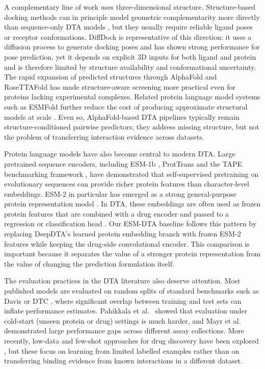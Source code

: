 A complementary line of work uses three-dimensional structure. Structure-based docking methods can in principle model geometric complementarity more directly than sequence-only DTA models \cite{kitchen2004docking}, but they usually require reliable ligand poses or receptor conformations. DiffDock \cite{corso2023diffdock} is representative of this direction: it uses a diffusion process to generate docking poses and has shown strong performance for pose prediction, yet it depends on explicit 3D inputs for both ligand and protein and is therefore limited by structure availability and conformational uncertainty. The rapid expansion of predicted structures through AlphaFold \cite{jumper2021alphafold} and RoseTTAFold \cite{baek2021rosettafold} has made structure-aware screening more practical even for proteins lacking experimental complexes. Related protein language model systems such as ESMFold further reduce the cost of producing approximate structural models at scale \cite{lin2023esm2}. Even so, AlphaFold-based DTA pipelines typically remain structure-conditioned pairwise predictors; they address missing structure, but not the problem of transferring interaction evidence across datasets.

Protein language models have also become central to modern DTA. Large pretrained sequence encoders, including ESM-1b \cite{rives2021biological}, ProtTrans \cite{elnaggar2022prottrans} and the TAPE benchmarking framework \cite{rao2019evaluating}, have demonstrated that self-supervised pretraining on evolutionary sequences can provide richer protein features than character-level embeddings. ESM-2 in particular has emerged as a strong general-purpose protein representation model \cite{lin2023esm2}. In DTA, these embeddings are often used as frozen protein features that are combined with a drug encoder and passed to a regression or classification head \cite{li2022effective}. Our ESM-DTA baseline follows this pattern by replacing DeepDTA's learned protein embedding branch with frozen ESM-2 features while keeping the drug-side convolutional encoder. This comparison is important because it separates the value of a stronger protein representation from the value of changing the prediction formulation itself.

The evaluation practices in the DTA literature also deserve attention. Most published models are evaluated on random splits of standard benchmarks such as Davis \cite{davis2011kinase} or DTC \cite{tang2014dtc}, where significant overlap between training and test sets can inflate performance estimates. Pahikkala et al.\ \cite{pahikkala2015kronrls} showed that evaluation under cold-start (unseen protein or drug) settings is much harder, and Mayr et al.\ \cite{mayr2018deeptox} demonstrated large performance gaps across different assay collections. More recently, low-data and few-shot approaches for drug discovery have been explored \cite{altae2017low}, but these focus on learning from limited labelled examples rather than on transferring binding evidence from known interactions in a different dataset.

